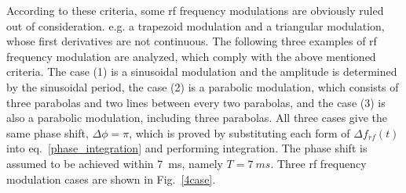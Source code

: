According to these criteria, some rf frequency modulations are obviously ruled out of consideration. e.g. a trapezoid modulation and a triangular modulation, whose first derivatives are not continuous. The following three examples of rf frequency modulation are analyzed, which comply with the above mentioned criteria. The case (1) is a sinusoidal modulation and the amplitude is determined by the sinusoidal period, the case (2) is a parabolic modulation, which consists of three parabolas and two lines between every two parabolas, and the case (3) is also a parabolic modulation, including three parabolas. All three cases give the same phase shift, $\Delta \phi=\pi$, which is proved by substituting each form of $\Delta f_{rf}(t)$ into eq.~\ref{phase_integration} and performing integration. The phase shift is assumed to be achieved within \SI{7}{ms}, namely $T=\SI{7}{ms}$. Three rf frequency modulation cases are shown in Fig.~\ref{4case}. 

%
%
%
%


